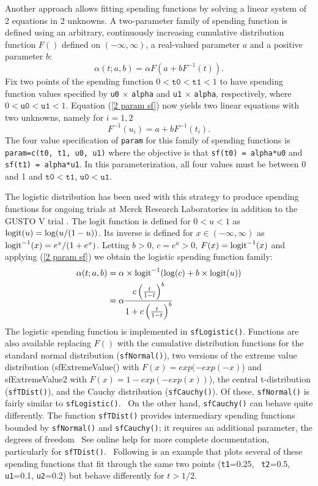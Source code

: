 Another approach allows fitting spending functions by solving a linear system
of 2 equations in 2 unknowns. A two-parameter family of spending function is
defined using an arbitrary, continuously increasing cumulative distribution
function $F()$ defined on $(-\infty, \infty)$, a real-valued parameter $a$ and
a positive parameter $b$:
\begin{equation}
\alpha(t;a,b)=\alpha F(a+bF^{-1}(t)).\label{2 param sf}%
\end{equation}
Fix two points of the spending function 
$0 < \mathtt{t0} < \mathtt{t1} < 1 $ to have spending function values specified by \texttt{u0} $\times
$ \texttt{alpha} and \texttt{u1} $\times$ \texttt{alpha}, respectively, where 
$0 < \mathtt{u0} < \mathtt{u1} < 1$. Equation (\ref{2 param sf}) now yields two linear equations with two
unknowns, namely for $i=1,2$
\[
F^{-1}(u_{i})=a+bF^{-1}(t_{i}).
\]
The four value specification of \texttt{param} for this family of spending
functions is \texttt{param=c(t0, t1, u0, u1)} where the objective is that
\texttt{sf(t0) = alpha*u0} and \texttt{sf(t1) = alpha*u1}. In this
parameterization, all four values must be between 0 and 1 and 
$\mathtt{t0} < \mathtt{t1}$, $\mathtt{u0} < \mathtt{u1}$.

The logistic distribution has been used with this strategy to
produce spending functions for ongoing trials at Merck Research Laboratories
in addition to the GUSTO V trial \cite{GUSTOV}. The logit function is defined
for $0<u<1$ as ${\rm logit}(u)=\log(u/(1-u))$. Its inverse is defined for
$x\in(-\infty,\infty)$ as ${\rm logit}^{-1}(x)=e^{x}/(1+e^{x})$. Letting $b>0$,
$c=e^{a}>0$, $F(x)={\rm logit}^{-1}(x)$ and applying (\ref{2 param sf}) we obtain
the logistic spending function family:
\begin{align}
\alpha(t;a,b)  & =\alpha\times {\rm logit}^{-1}(\log(c)+b\times
{\rm logit}(u))\label{logistic sf}\\
& =\alpha\frac{c\left(  \frac{t}{1-t}\right)  ^{b}}{1+c\left(  \frac{t}%
{1-t}\right)  ^{b}}%
\end{align}
The logistic spending function is implemented in \texttt{sfLogistic()}.
Functions are also available replacing $F()$ with the cumulative distribution
functions for the standard normal distribution (\texttt{sfNormal()}), two
versions of the extreme value distribution (sfExtremeValue() with
$F(x)=exp(-exp(-x)$) and sfExtremeValue2 with $F(x)=1-exp(-exp(x))$), the
central t-distribution (\texttt{sfTDist()}), and the Cauchy distribution
(\texttt{sfCauchy()}). Of these, \texttt{sfNormal()} is fairly similar to
\texttt{sfLogistic()}. \ On the other hand, \texttt{sfCauchy()} can behave
quite differently. The function \texttt{sfTDist()} provides intermediary
spending functions bounded by \texttt{sfNormal()} and \texttt{sfCauchy()}; it
requires an additional parameter, the degrees of freedom \ See online help for
more complete documentation, particularly for \texttt{sfTDist()}. \ Following
is an example that plots several of these spending functions that fit through
the same two points (\texttt{t1}=0.25, \ \texttt{t2}=0.5, \texttt{u1}=0.1,
\texttt{u2}=0.2) but behave differently for $t>1/2$.

